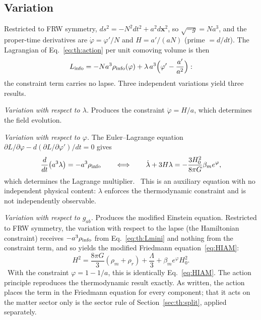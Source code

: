\subsection{Variation}
Restricted to FRW symmetry, $ds^2=-N^2dt^2+a^2d\mathbf x^2$, so $\sqrt{-g}=Na^3$, and the proper-time derivatives are $\dot\varphi=\varphi'/N$ and
$H=a'/(aN)$ (prime $=d/dt$). The Lagrangian of Eq.~\eqref{eq:th:action} per unit comoving volume is then
\begin{equation}L_{\rm info}=-Na^3\rho_{\rm info}(\varphi)+\lambda\,a^3\Big(\varphi'-\frac{a'}{a^2}\Big):\label{eq:th:Lmini}\end{equation}
the constraint term carries no lapse. Three independent variations yield three results. \derived{}

\emph{Variation with respect to $\lambda$.} Produces the constraint $\dot\varphi=H/a$, which determines the field evolution.

\emph{Variation with respect to $\varphi$.} The Euler--Lagrange equation $\partial L/\partial\varphi-d(\partial L/\partial\varphi')/dt=0$ gives
\begin{equation}\frac{d}{dt}\big(a^3\lambda\big)=-a^3\rho_{\rm info}\qquad\Longleftrightarrow\qquad\dot\lambda+3H\lambda=-\frac{3H_0^2}{8\pi G}\beta_me^{\varphi},\label{eq:th:lambdadot}\end{equation}
which determines the Lagrange multiplier. \derived\ This is an auxiliary equation with no independent physical content: $\lambda$ enforces the
thermodynamic constraint and is not independently observable.

\emph{Variation with respect to $g_{ab}$.} Produces the modified Einstein equation. Restricted to FRW symmetry, the variation with respect to the lapse
(the Hamiltonian constraint) receives $-a^3\rho_{\rm info}$ from Eq.~\eqref{eq:th:Lmini} and nothing from the constraint term, and so yields the modified
Friedmann equation~\eqref{eq:HIAM}:
\begin{equation}H^2=\frac{8\pi G}{3}(\rho_m+\rho_r)+\frac\Lambda3+\beta_me^{\varphi}H_0^2 .\label{eq:th:Hvar}\end{equation}
\derived\ With the constraint $\varphi=1-1/a$, this is identically Eq.~\eqref{eq:HIAM}. The action principle reproduces the thermodynamic result exactly. As
written, the action places the term in the Friedmann equation for every component; that it acts on the matter sector only is the sector rule of
Section~\ref{sec:th:split}, applied separately.

